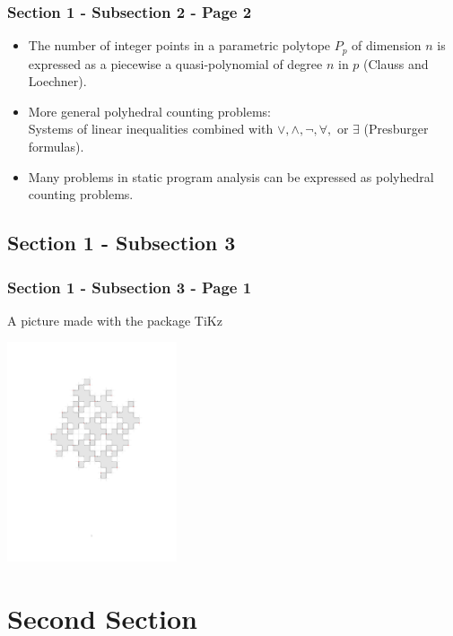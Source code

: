 \documentclass{beamer}
\begin{document}
\begin{frame}\frametitle{Section 1 - Subsection 2 - Page 2}
	\begin{itemize}
		\item <1-> The number of integer points in a \alert{parametric polytope} $P_{{p}}$ of dimension $n$ is expressed as a piecewise a quasi-polynomial of degree $n$ in ${p}$ (Clauss and Loechner).
		
		\item <2->
		More general \alert{polyhedral counting problems}:\\
		Systems of linear inequalities combined with $\lor, \land, \neg, \forall,$ or $\exists$ (Presburger formulas).
		\item <3->
		Many problems in \alert{static program analysis} can be expressed as polyhedral counting problems.
	\end{itemize}
\end{frame}

\subsection{Section 1 - Subsection 3}

\begin{frame}\frametitle{Section 1 - Subsection 3 - Page 1}
	A picture made with the package TiKz\\
	\begin{example}
		\centering
		\includegraphics[width=5cm]{images/abadab-anti-theta-01.pdf}
	\end{example}
\end{frame}

\section{Second Section}
\end{document}
